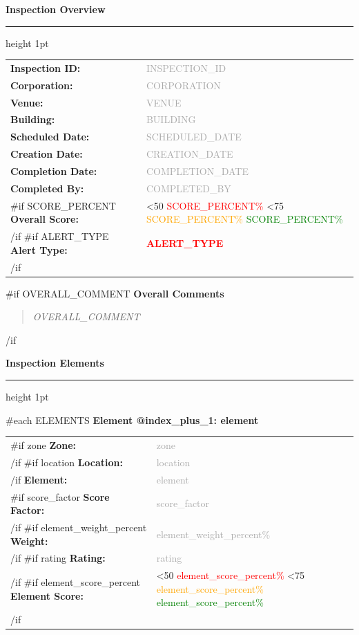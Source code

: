 \documentclass[11pt,a4paper]{article}
\newcommand{\sectionheader}[1]{%
    \vspace{12pt}%
    {\Large\bfseries\color{headerblue}#1}%
    \vspace{6pt}%
    \hrule height 1pt%
    \vspace{12pt}%
}
\newcommand{\subsectionheader}[1]{%
    \vspace{8pt}%
    {\large\bfseries\color{darkgray}#1}%
    \vspace{4pt}%
}
\newcommand{\fieldlabel}[1]{\textbf{#1:}}
\newcommand{\fieldvalue}[1]{\textcolor{darkgray}{#1}}
\newcommand{\scorecolor}[1]{%
    \ifnum #1<50
        \textcolor{red}{#1\%}%
    \else\ifnum #1<75
        \textcolor{orange}{#1\%}%
    \else
        \textcolor{green}{#1\%}%
    \fi\fi
}
\newcommand{\alerttype}[1]{%
    \textcolor{red}{\textbf{#1}}%
}
\begin{document}
\sectionheader{Inspection Overview}

\begin{tabular}{@{}p{4cm}p{10cm}@{}}
    \fieldlabel{Inspection ID} & \fieldvalue{{{INSPECTION_ID}}} \\[6pt]
    \fieldlabel{Corporation} & \fieldvalue{{{CORPORATION}}} \\[6pt]
    \fieldlabel{Venue} & \fieldvalue{{{VENUE}}} \\[6pt]
    \fieldlabel{Building} & \fieldvalue{{{BUILDING}}} \\[6pt]
    \fieldlabel{Scheduled Date} & \fieldvalue{{{SCHEDULED_DATE}}} \\[6pt]
    \fieldlabel{Creation Date} & \fieldvalue{{{CREATION_DATE}}} \\[6pt]
    \fieldlabel{Completion Date} & \fieldvalue{{{COMPLETION_DATE}}} \\[6pt]
    \fieldlabel{Completed By} & \fieldvalue{{{COMPLETED_BY}}} \\[6pt]
    {{#if SCORE_PERCENT}}
    \fieldlabel{Overall Score} & \scorecolor{{{SCORE_PERCENT}}} \\[6pt]
    {{/if}}
    {{#if ALERT_TYPE}}
    \fieldlabel{Alert Type} & \alerttype{{{ALERT_TYPE}}} \\[6pt]
    {{/if}}
\end{tabular}

{{#if OVERALL_COMMENT}}
\subsectionheader{Overall Comments}
\begin{quote}
    \textit{{{OVERALL_COMMENT}}}
\end{quote}
{{/if}}

\newpage

\sectionheader{Inspection Elements}

{{#each ELEMENTS}}
\subsectionheader{Element {{@index_plus_1}}: {{element}}}

\begin{tabular}{@{}p{4cm}p{10cm}@{}}
    {{#if zone}}
    \fieldlabel{Zone} & \fieldvalue{{{zone}}} \\[6pt]
    {{/if}}
    {{#if location}}
    \fieldlabel{Location} & \fieldvalue{{{location}}} \\[6pt]
    {{/if}}
    \fieldlabel{Element} & \fieldvalue{{{element}}} \\[6pt]
    {{#if score_factor}}
    \fieldlabel{Score Factor} & \fieldvalue{{{score_factor}}} \\[6pt]
    {{/if}}
    {{#if element_weight_percent}}
    \fieldlabel{Weight} & \fieldvalue{{{element_weight_percent}}\%} \\[6pt]
    {{/if}}
    {{#if rating}}
    \fieldlabel{Rating} & \fieldvalue{{{rating}}} \\[6pt]
    {{/if}}
    {{#if element_score_percent}}
    \fieldlabel{Element Score} & \scorecolor{{{element_score_percent}}} \\[6pt]
    {{/if}}
\end{tabular}
\end{document}
